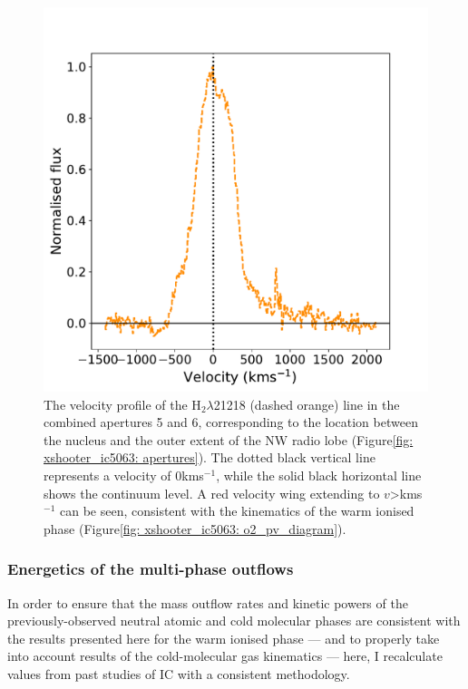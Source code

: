 \begin{figure}[!t]
	\centering
	\includegraphics[width=0.7\linewidth]{figures/xshooter_ic5063/ap56_h2_velocity_profile.pdf}
	\caption[Velocity profile of the H$_2\lambda$21218 emission line at the location between the nucleus and outer extent of the NW radio lobe in IC.]{The velocity profile of the H$_2\lambda$21218 (dashed orange) line in the combined apertures 5 and 6, corresponding to the location between the nucleus and the outer extent of the NW radio lobe (Figure\;\ref{fig: xshooter_ic5063: apertures}). The dotted black vertical line represents a velocity of 0\;km\;s$^{-1}$, while the solid black horizontal line shows the continuum level. A red velocity wing extending to $v$\;\textgreater{}\;km\;s$^{-1}$ can be seen, consistent with the kinematics of the warm ionised phase (Figure\;\ref{fig: xshooter_ic5063: o2_pv_diagram}).}
	\label{fig: xshooter_ic5063: ap56_h2_velocity_profile}
\end{figure}

\subsubsection{Energetics of the multi-phase outflows}
\label{section: xshooter_ic5063: discussion: multiphase: energetics}

In order to ensure that the mass outflow rates and kinetic powers of the previously-observed neutral atomic and cold molecular phases are consistent with the results presented here for the warm ionised phase --- and to properly take into account results of the cold-molecular gas kinematics \citep{Morganti2015, Oosterloo2017} --- here, I recalculate values from past studies of IC with a consistent methodology.

